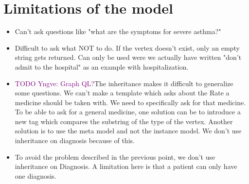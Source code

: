 \section{Limitations of the model}
\begin{itemize}
	\item Can't ask questions like "what are the symptoms for severe asthma?"
	\item Difficult to ask what NOT to do. If the vertex doesn't exist, only an empty string gets returned. Can only be used were we actually have written "don't admit to the hospital" as an example with hospitalization.
	\item \textcolor{purple}{TODO Yngve: Graph QL?}The inheritance makes it difficult to generalize some questions. We can't make a template which asks about the Rate a medicine should be taken with. We need to specifically ask for that medicine. To be able to ask for a general medicine, one solution can be to introduce a new tag which compares the substring of the type of the vertex. Another solution is to use the meta model and not the instance model. We don't use inheritance on diagnosis because of this.
	\item To avoid the problem described in the previous point, we don't use inheritance on Diagnosis. A limitation here is that  
	a patient can only have one diagnosis.
\end{itemize}
	

